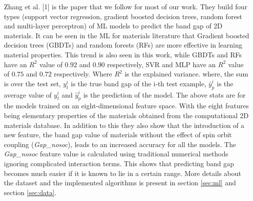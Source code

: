 \documentclass{article}
\begin{document}
Zhang et al. [1] is the paper that we follow for most of our work. They build four types (support vector regression, gradient boosted decision trees, random forest and multi-layer perceptron) of ML models to predict the band gap of 2D materials. It can be seen in the ML for materials literature that Gradient boosted decision trees (GBDTs) and random forests (RFs) are more effective in learning material properties. This trend is also seen in this work, while GBDTs and RFs have an $R^2$ value of $0.92$ and $0.90$ respectively, SVR and MLP have an $R^2$ value of $0.75$ and $0.72$ respectively. Where $R^2$ is the explained variance.
where, the sum is over the test set, $y^{i}_{t}$ is the true band gap of the i-th test example, $\bar{y}^{i}_{p}$ is the average value of $y^{i}_{t}$ and $\hat{y}^{i}_{p}$ is the prediction of the model. The above stats are for the models trained on an eight-dimensional feature space. With the eight features being elementary properties of the materials obtained from the computational 2D materials database. In addition to this they also show that the introduction of a new feature, the band gap value of materials without the effect of spin orbit coupling (\emph{Gap\_nosoc}), leads to an increased accuracy for all the models. The \emph{Gap\_nosoc} feature value is calculated using traditional numerical methods ignoring complicated interaction terms. This shows that predicting band gap becomes much easier if it is known to lie in a certain range. More details about the dataset and the implemented algorithms is present in section \ref{sec:ml} and section \ref{sec:data}.\par
\end{document}
